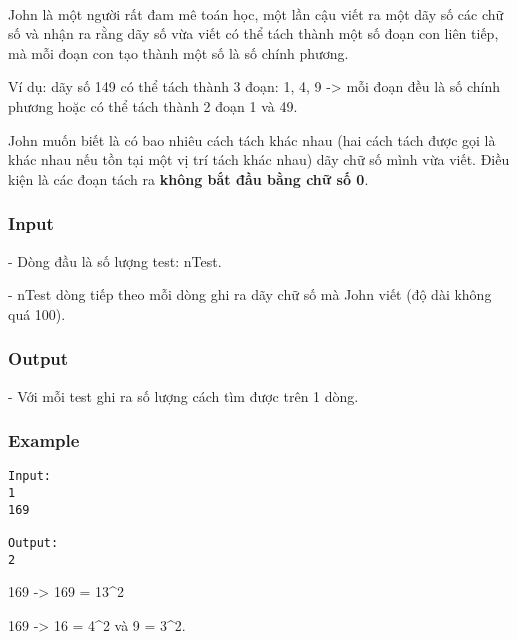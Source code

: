 

 

John là một người rất đam mê toán học, một lần cậu viết ra một dãy số các chữ số và nhận ra rằng dãy số vừa viết có thể tách thành một số đoạn con liên tiếp, mà mỗi đoạn con tạo thành một số là số chính phương.


Ví dụ: dãy số 149 có thể tách thành 3 đoạn: 1, 4, 9 -> mỗi đoạn đều là số chính phương hoặc có thể tách thành 2 đoạn 1 và 49.


John muốn biết là có bao nhiêu cách tách khác nhau (hai cách tách được gọi là khác nhau nếu tồn tại một vị trí tách khác nhau) dãy chữ số mình vừa viết. Điều kiện là các đoạn tách ra \textbf{không bắt đầu bằng chữ số 0}.

\subsubsection{Input}

- Dòng đầu là số lượng test: nTest.


- nTest dòng tiếp theo mỗi dòng ghi ra dãy chữ số mà John viết (độ dài không quá 100).

\subsubsection{Output}

- Với mỗi test ghi ra số lượng cách tìm được trên 1 dòng.

\subsubsection{Example}
\begin{verbatim}
Input:
1
169

Output:
2
\end{verbatim}

169 -> 169 = 13^2


169 -> 16 = 4^2 và 9 = 3^2.
